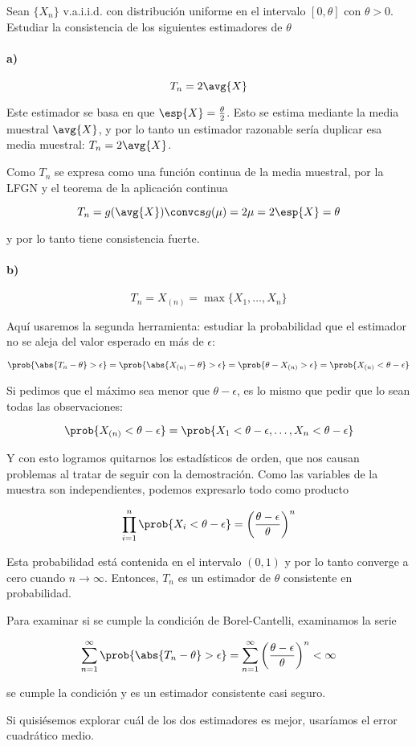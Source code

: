 \documentclass{apuntes}
\begin{document}
\begin{example} Sean $\{X_n\}$ v.a.i.i.d. con distribución uniforme en el intervalo $[0,\theta]$ con $\theta > 0$. Estudiar la consistencia de los siguientes estimadores de $\theta$

\paragraph{a)}

\[ T_n = 2\avg{X} \]

Este estimador se basa en que $\esp{X} = \frac{\theta}{2}$. Esto se estima mediante la media muestral $\avg{X}$, y por lo tanto un estimador razonable sería duplicar esa media muestral: $T_n = 2 \avg{X}$.

Como $T_n$ se expresa como una función continua de la media muestral, por la LFGN y el teorema de la aplicación continua

\[ T_n = g(\avg{X}) \convcs g(\mu) = 2\mu = 2\esp{X} = \theta \]

y por lo tanto tiene consistencia fuerte.

\paragraph{b)}

\[ T_n=X_{(n)} = \max \{ X_1,\dotsc,X_n\} \]

Aquí usaremos la segunda herramienta: estudiar la probabilidad que el estimador no se aleja del valor esperado en más de $\epsilon$:

\[ \prob{\abs{T_n - \theta} > \epsilon} = \prob{\abs{X_{(n)} - \theta} > \epsilon} = \prob{\theta - X_{(n)} > \epsilon} = \prob{X_{(n)} < \theta - \epsilon} \]

Si pedimos que el máximo sea menor que $\theta - \epsilon$, es lo mismo que pedir que lo sean todas las observaciones:

\[ \prob{X_{(n)} < \theta - \epsilon} = \prob{X_1 < \theta - \epsilon, \dotsc , X_n < \theta - \epsilon} \]

Y con esto logramos quitarnos los estadísticos de orden, que nos causan problemas al tratar de seguir con la demostración. Como las variables de la muestra son independientes, podemos expresarlo todo como producto

\[ \prod_{i=1}^n \prob{X_i < \theta - \epsilon} = \left(\frac{\theta - \epsilon}{\theta}\right)^n \]

Esta probabilidad está contenida en el intervalo $(0, 1)$ y por lo tanto converge a cero cuando $n\to \infty$. Entonces, $T_n$ es un estimador de $\theta$ consistente en probabilidad.

Para examinar si se cumple la condición de Borel-Cantelli, examinamos la serie

\[ \sum_{n=1}^\infty \prob{\abs{T_n - \theta} > \epsilon} = \sum_{n=1}^\infty \left(\frac{\theta - \epsilon}{\theta}\right)^n < \infty \]

se cumple la condición y es un estimador consistente casi seguro.

Si quisiésemos explorar cuál de los dos estimadores es mejor, usaríamos el error cuadrático medio.

\end{example}
\end{document}
